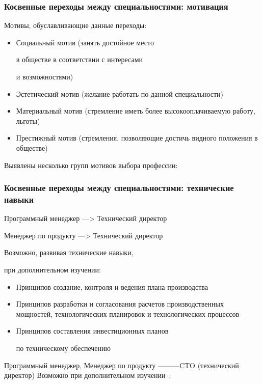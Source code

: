 \documentclass{../industrial-development}
\begin{document}
\begin{frame} \frametitle{Косвенные переходы между специальностями: мотивация }

 \begin{block}{}
Мотивы, обуславливающие данные переходы:
  \end{block}
\begin{itemize}
\item Социальный мотив (занять достойное место 

в обществе в соответствии с интересами 

и возможностями)
\item Эстетический мотив (желание работать по данной специальности)
\item Материальный мотив (стремление иметь более высокооплачиваемую работу, льготы) 
\item Престижный мотив (стремления, позволяющие достичь видного положения в обществе)
  \end{itemize}
\end{frame}

\lecturenotes

Выявлены несколько групп мотивов выбора профессии:



\begin{frame} \frametitle{Косвенные переходы между специальностями: технические навыки}

\begin{block}{Программный менеджер ---> Технический директор  

Менеджер по продукту ---> Технический директор }

Возможно, развивая технические навыки, 

при дополнительном изучении:
  \end{block}
\begin{itemize}
  \item Принципов создание, контроля и ведения плана производства
  \item Принципов разработки и согласования расчетов производственных мощностей, технологических планировок и технологических процессов
\item Принципов составления инвестиционных планов 

по техническому обеспечению
  \end{itemize}
\end{frame}

\lecturenotes

Программный менеджер, Менеджер по продукту ---------CTO (технический директор)
Возможно при дополнительном изучении~\cite{rab}:
 
\end{document}
